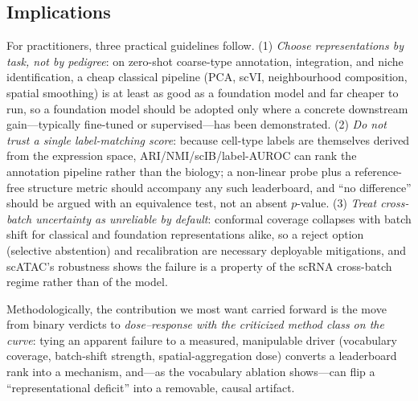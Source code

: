 \documentclass[fleqn,10pt,lineno]{wlpeerj}  %
\begin{document}
\subsection*{Implications}
For practitioners, three practical guidelines follow. (1) \emph{Choose representations by task, not by pedigree}: on zero-shot coarse-type annotation, integration, and niche identification, a cheap classical pipeline (PCA, scVI, neighbourhood composition, spatial smoothing) is at least as good as a foundation model and far cheaper to run, so a foundation model should be adopted only where a concrete downstream gain---typically fine-tuned or supervised---has been demonstrated. (2) \emph{Do not trust a single label-matching score}: because cell-type labels are themselves derived from the expression space, ARI/NMI/scIB/label-AUROC can rank the annotation pipeline rather than the biology; a non-linear probe plus a reference-free structure metric should accompany any such leaderboard, and ``no difference'' should be argued with an equivalence test, not an absent $p$-value. (3) \emph{Treat cross-batch uncertainty as unreliable by default}: conformal coverage collapses with batch shift for classical and foundation representations alike, so a reject option (selective abstention) and recalibration are necessary deployable mitigations, and scATAC's robustness shows the failure is a property of the scRNA cross-batch regime rather than of the model.

Methodologically, the contribution we most want carried forward is the move from binary verdicts to \emph{dose--response with the criticized method class on the curve}: tying an apparent failure to a measured, manipulable driver (vocabulary coverage, batch-shift strength, spatial-aggregation dose) converts a leaderboard rank into a mechanism, and---as the vocabulary ablation shows---can flip a ``representational deficit'' into a removable, causal artifact.
\end{document}
